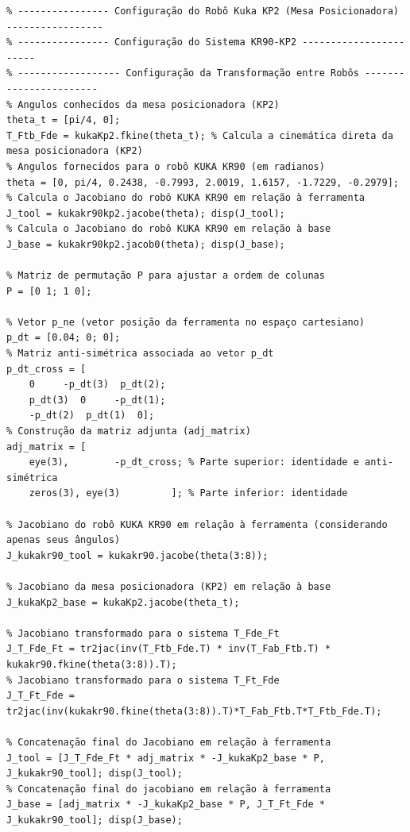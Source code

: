 \documentclass[10pt]{article}
\begin{document}
\begin{lstlisting}[caption={Código do Jacobiano de $F_t$ com respeito a $F_{de}$}, label={code:subsecao28}]
% ------------------ Configuração do Robô Kuka KR90 ------------------------
% ---------------- Configuração do Robô Kuka KP2 (Mesa Posicionadora) -----------------
% ---------------- Configuração do Sistema KR90-KP2 -----------------------
% ------------------ Configuração da Transformação entre Robôs -----------------------
% Angulos conhecidos da mesa posicionadora (KP2)
theta_t = [pi/4, 0]; 
T_Ftb_Fde = kukaKp2.fkine(theta_t); % Calcula a cinemática direta da mesa posicionadora (KP2)
% Angulos fornecidos para o robô KUKA KR90 (em radianos)
theta = [0, pi/4, 0.2438, -0.7993, 2.0019, 1.6157, -1.7229, -0.2979];
% Calcula o Jacobiano do robô KUKA KR90 em relação à ferramenta
J_tool = kukakr90kp2.jacobe(theta); disp(J_tool);
% Calcula o Jacobiano do robô KUKA KR90 em relação à base
J_base = kukakr90kp2.jacob0(theta); disp(J_base);

% Matriz de permutação P para ajustar a ordem de colunas
P = [0 1; 1 0];

% Vetor p_ne (vetor posição da ferramenta no espaço cartesiano)
p_dt = [0.04; 0; 0];
% Matriz anti-simétrica associada ao vetor p_dt
p_dt_cross = [
    0     -p_dt(3)  p_dt(2);
    p_dt(3)  0     -p_dt(1);
    -p_dt(2)  p_dt(1)  0];
% Construção da matriz adjunta (adj_matrix)
adj_matrix = [
    eye(3),        -p_dt_cross; % Parte superior: identidade e anti-simétrica
    zeros(3), eye(3)         ]; % Parte inferior: identidade

% Jacobiano do robô KUKA KR90 em relação à ferramenta (considerando apenas seus ângulos)
J_kukakr90_tool = kukakr90.jacobe(theta(3:8));

% Jacobiano da mesa posicionadora (KP2) em relação à base
J_kukaKp2_base = kukaKp2.jacobe(theta_t);

% Jacobiano transformado para o sistema T_Fde_Ft
J_T_Fde_Ft = tr2jac(inv(T_Ftb_Fde.T) * inv(T_Fab_Ftb.T) * kukakr90.fkine(theta(3:8)).T); 
% Jacobiano transformado para o sistema T_Ft_Fde
J_T_Ft_Fde = tr2jac(inv(kukakr90.fkine(theta(3:8)).T)*T_Fab_Ftb.T*T_Ftb_Fde.T);

% Concatenação final do Jacobiano em relação à ferramenta
J_tool = [J_T_Fde_Ft * adj_matrix * -J_kukaKp2_base * P, J_kukakr90_tool]; disp(J_tool);
% Concatenação final do jacobiano em relação à ferramenta
J_base = [adj_matrix * -J_kukaKp2_base * P, J_T_Ft_Fde * J_kukakr90_tool]; disp(J_base);
\end{lstlisting}
\end{document}
